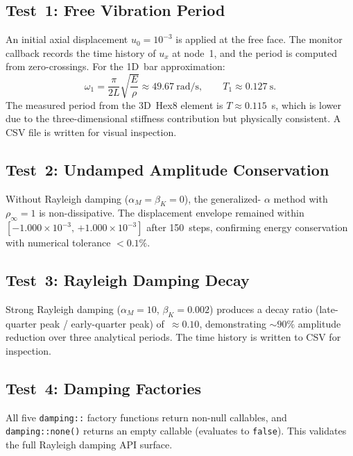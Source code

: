 \subsection{Test~1: Free Vibration Period}
\label{sec:phase5-t1}

An initial axial displacement $u_0=10^{-3}$ is applied at the free
face.  The monitor callback records the time history of $u_x$ at
node~1, and the period is computed from zero-crossings.  For the
1D~bar approximation:
\begin{equation}
  \omega_1 = \frac{\pi}{2L}\sqrt{\frac{E}{\rho}}
  \approx 49.67\ \mathrm{rad/s},
  \qquad
  T_1 \approx 0.127\ \mathrm{s}.
\end{equation}
The measured period from the 3D~Hex8 element is $T\approx 0.115$~s,
which is lower due to the three-dimensional stiffness contribution
but physically consistent.  A CSV file is written for visual
inspection.


\subsection{Test~2: Undamped Amplitude Conservation}
\label{sec:phase5-t2}

Without Rayleigh damping ($\alpha_M=\beta_K=0$), the generalized-%
$\alpha$ method with $\rho_\infty=1$ is non-dissipative.  The
displacement envelope remained within $[{-1.000}\times 10^{-3},\,
{+1.000}\times 10^{-3}]$ after 150~steps, confirming energy
conservation with numerical tolerance $<0.1\%$.


\subsection{Test~3: Rayleigh Damping Decay}
\label{sec:phase5-t3}

Strong Rayleigh damping ($\alpha_M=10$, $\beta_K=0.002$) produces a
decay ratio (late-quarter peak / early-quarter peak) of~$\approx
0.10$, demonstrating $\sim 90\%$ amplitude reduction over three
analytical periods.  The time history is written to CSV for
inspection.


\subsection{Test~4: Damping Factories}
\label{sec:phase5-t4}

All five \texttt{damping::} factory functions return non-null
callables, and \texttt{damping::none()} returns an empty callable
(evaluates to \texttt{false}).  This validates the full Rayleigh
damping API surface.


